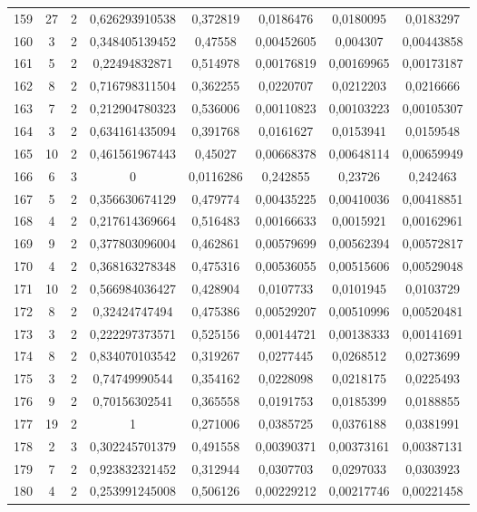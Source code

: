 \begin{longtable}{|c|c|c|c|c|c|c|c|}
159 & 27 & 2 & 0,626293910538 & 0,372819 & 0,0186476 & 0,0180095 & 0,0183297  \\
160 & 3 & 2 & 0,348405139452 & 0,47558 & 0,00452605 & 0,004307 & 0,00443858  \\
161 & 5 & 2 & 0,22494832871 & 0,514978 & 0,00176819 & 0,00169965 & 0,00173187  \\
162 & 8 & 2 & 0,716798311504 & 0,362255 & 0,0220707 & 0,0212203 & 0,0216666  \\
163 & 7 & 2 & 0,212904780323 & 0,536006 & 0,00110823 & 0,00103223 & 0,00105307  \\
164 & 3 & 2 & 0,634161435094 & 0,391768 & 0,0161627 & 0,0153941 & 0,0159548  \\
165 & 10 & 2 & 0,461561967443 & 0,45027 & 0,00668378 & 0,00648114 & 0,00659949  \\
166 & 6 & 3 & 0 & 0,0116286 & 0,242855 & 0,23726 & 0,242463  \\
167 & 5 & 2 & 0,356630674129 & 0,479774 & 0,00435225 & 0,00410036 & 0,00418851  \\
168 & 4 & 2 & 0,217614369664 & 0,516483 & 0,00166633 & 0,0015921 & 0,00162961  \\
169 & 9 & 2 & 0,377803096004 & 0,462861 & 0,00579699 & 0,00562394 & 0,00572817  \\
170 & 4 & 2 & 0,368163278348 & 0,475316 & 0,00536055 & 0,00515606 & 0,00529048  \\
171 & 10 & 2 & 0,566984036427 & 0,428904 & 0,0107733 & 0,0101945 & 0,0103729  \\
172 & 8 & 2 & 0,32424747494 & 0,475386 & 0,00529207 & 0,00510996 & 0,00520481  \\
173 & 3 & 2 & 0,222297373571 & 0,525156 & 0,00144721 & 0,00138333 & 0,00141691  \\
174 & 8 & 2 & 0,834070103542 & 0,319267 & 0,0277445 & 0,0268512 & 0,0273699  \\
175 & 3 & 2 & 0,74749990544 & 0,354162 & 0,0228098 & 0,0218175 & 0,0225493  \\
176 & 9 & 2 & 0,70156302541 & 0,365558 & 0,0191753 & 0,0185399 & 0,0188855  \\
177 & 19 & 2 & 1 & 0,271006 & 0,0385725 & 0,0376188 & 0,0381991  \\
178 & 2 & 3 & 0,302245701379 & 0,491558 & 0,00390371 & 0,00373161 & 0,00387131  \\
179 & 7 & 2 & 0,923832321452 & 0,312944 & 0,0307703 & 0,0297033 & 0,0303923  \\
180 & 4 & 2 & 0,253991245008 & 0,506126 & 0,00229212 & 0,00217746 & 0,00221458  \\

\end{longtable}
